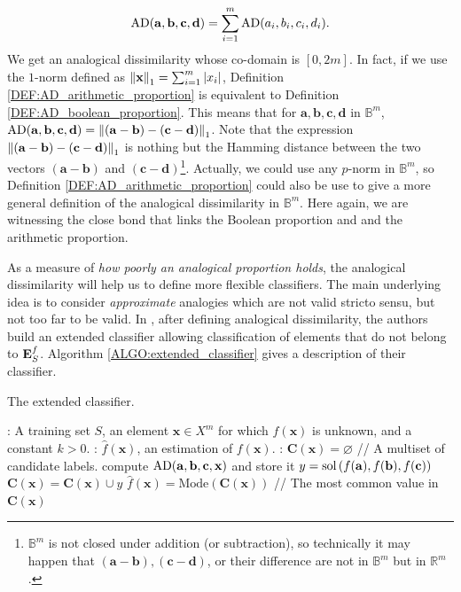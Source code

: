 $$\AD(\mathbf{a}, \mathbf{b},\mathbf{c},\mathbf{d}) = \sum\limits_{i=1}^m
\AD(a_i,b_i,c_i,d_i).$$
We get an analogical dissimilarity whose co-domain is $[0, 2m]$. In fact, if we
use the $1$-norm defined as $\norm{1}{\mathbf{x}} = \sum_{i = 1}^m |x_i|$,
Definition \ref{DEF:AD_arithmetic_proportion} is equivalent to Definition
\ref{DEF:AD_boolean_proportion}. This means that for $\mathbf{a},
\mathbf{b},\mathbf{c},\mathbf{d}$ in $\mathbb{B}^m$, $\AD(\mathbf{a},
\mathbf{b},\mathbf{c},\mathbf{d}) =
\norm{1}{(\mathbf{a}-\mathbf{b})-(\mathbf{c}-\mathbf{d})}$. Note that the
expression $\norm{1}{(\mathbf{a}-\mathbf{b})-(\mathbf{c}-\mathbf{d})}$ is
nothing but the Hamming distance between the two vectors
$(\mathbf{a}-\mathbf{b})$ and $(\mathbf{c}-\mathbf{d})$\footnote{$\mathbb{B}^m$
is not closed under addition (or subtraction), so technically it may happen that
$(\mathbf{a} - \mathbf{b}), (\mathbf{c} - \mathbf{d})$, or their difference are
not in $\mathbb{B}^m$ but in $\mathbb{R}^m$.}.
Actually, we could use any $p$-norm in $\mathbb{B}^m$, so
Definition \ref{DEF:AD_arithmetic_proportion} could also be use to give a more
general definition of the analogical dissimilarity in $\mathbb{B}^m$. Here
again, we are witnessing the close bond that links the Boolean proportion and
and the arithmetic proportion.

As a measure of \textit{how poorly an analogical proportion holds}, the
analogical dissimilarity will help us to define more flexible classifiers.  The
main underlying idea is to consider {\it approximate} analogies which are not
valid stricto sensu, but not too far to be valid.
In \cite{BayMicDelIJCAI07}, after defining analogical dissimilarity,  the authors
build an extended classifier allowing classification of elements that do not
belong to $\esf$. Algorithm \ref{ALGO:extended_classifier} gives a
description of their classifier.

\begin{algorithm}[!ht]
 \caption{The extended classifier.}
       \label{ALGO:extended_classifier}
       \begin{algorithmic}

      : A training set $S$, an element $\mathbf{x} \in X^m$
         for which $f(\mathbf{x})$ is unknown, and a constant $k > 0$.
         : $\hat{f}(\mathbf{x})$, an estimation of
         $f(\mathbf{x})$.
    : $\mathbf{C}(\mathbf{x}) = \varnothing$ \quad \quad // A
    multiset of candidate labels.
         \STATE compute $\AD(\mathbf{a}, \mathbf{b}, \mathbf{c}, \mathbf{x})$ and store it
	    \ENDFOR
        \STATE $y = \sol\left(f(\mathbf{a}), f(\mathbf{b}), f(\mathbf{c})\right)$
    \STATE $ \mathbf{C}(\mathbf{x}) = \mathbf{C}(\mathbf{x}) \cup y$
    \ENDFOR
    \STATE $\hat{f}(\mathbf{x}) = \text{Mode} (\mathbf{C}(\mathbf{x}))$ // The
         most common value in $\mathbf{C}(\mathbf{x})$
\end{algorithmic}
\end{algorithm}


